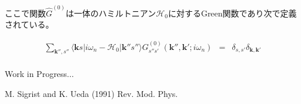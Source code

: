 \documentclass[uplatex,a4j,12pt,dvipdfmx]{jsarticle}
\begin{document}
ここで関数$\hat{G}^{(0)}$は一体のハミルトニアン$\mathcal{H}_{0}$に対するGreen関数であり次で定義されている。

\begin{eqnarray}
	\sum_{\bm{k}'' , s''}
	\langle \bm{k} s |  i \omega_{n} - \mathcal{H}_{0} | \bm{k}'' s'' \rangle
	G_{s''s'}^{(0)} ( \bm{k}'' , \bm{k}' ; i \omega_{n} )
	&=&
	\delta_{s,s'}
	\delta_{\bm{k},\bm{k}'}
\end{eqnarray}
\ \\

Work in Progress...

\begin{thebibliography}{9}
	 M. Sigrist and K. Ueda (1991) Rev. Mod. Phys.

\end{thebibliography}
\end{document}
